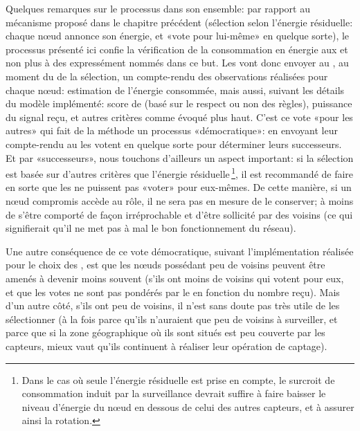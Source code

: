 Quelques remarques sur le processus dans son ensemble: par rapport au mécanisme proposé dans le chapitre précédent (sélection selon l'énergie résiduelle: chaque nœud annonce son énergie, et «vote pour lui-même» en quelque sorte), le processus présenté ici confie la vérification de la consommation en énergie aux \cns et non plus à des \vns expressément nommés dans ce but.
Les \cns vont donc envoyer au \ch, au moment du  de la sélection, un compte-rendu des observations réalisées pour chaque nœud: estimation de l'énergie consommée, mais aussi, suivant les détails du modèle implémenté: score de \reput (basé sur le respect ou non des règles), puissance du signal reçu, et autres critères comme évoqué plus haut.
C'est ce vote «pour les autres» qui fait de la méthode un processus «démocratique»: en envoyant leur compte-rendu au \CH les \cns votent en quelque sorte pour déterminer leurs successeurs.
Et par «successeurs», nous touchons d'ailleurs un aspect important: si la sélection est basée sur d'autres critères que l'énergie résiduelle\,\footnote{Dans le cas où seule l'énergie résiduelle est prise en compte, le surcroit de consommation induit par la surveillance devrait suffire à faire baisser le niveau d'énergie du nœud en dessous de celui des autres capteurs, et à assurer ainsi la rotation.}, il est recommandé de faire en sorte que les \cns ne puissent pas «voter» pour eux-mêmes.
De cette manière, si un nœud compromis accède au rôle, il ne sera pas en mesure de le conserver; à moins de s'être comporté de façon irréprochable et d'être sollicité par des \cns voisins (ce qui signifierait qu'il ne met pas à mal le bon fonctionnement du réseau).

Une autre conséquence de ce vote démocratique, suivant l'implémentation réalisée pour le choix des \cns, est que les nœuds possédant peu de voisins peuvent être amenés à devenir moins souvent \cns (s'ils ont moins de \cns voisins qui votent pour eux, et que les votes ne sont pas pondérés par le \ch en fonction du nombre reçu).
Mais d'un autre côté, s'ils ont peu de voisins, il n'est sans doute pas très utile de les sélectionner (à la fois parce qu'ils n'auraient que peu de voisins à surveiller, et parce que si la zone géographique où ils sont situés est peu couverte par les capteurs, mieux vaut qu'ils continuent à réaliser leur opération de captage).
